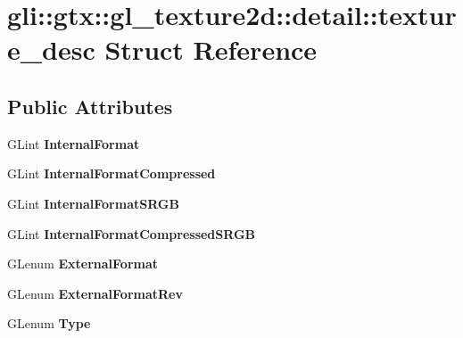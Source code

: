 \hypertarget{structgli_1_1gtx_1_1gl__texture2d_1_1detail_1_1texture__desc}{\section{gli\-:\-:gtx\-:\-:gl\-\_\-texture2d\-:\-:detail\-:\-:texture\-\_\-desc \-Struct \-Reference}
\label{structgli_1_1gtx_1_1gl__texture2d_1_1detail_1_1texture__desc}
}
\subsection*{\-Public \-Attributes}
\begin{DoxyCompactItemize}
\item 
\hypertarget{structgli_1_1gtx_1_1gl__texture2d_1_1detail_1_1texture__desc_a1516e18e5bd033b3e9d68e9b4dc4c6d1}{\-G\-Lint {\bfseries \-Internal\-Format}}\label{structgli_1_1gtx_1_1gl__texture2d_1_1detail_1_1texture__desc_a1516e18e5bd033b3e9d68e9b4dc4c6d1}

\item 
\hypertarget{structgli_1_1gtx_1_1gl__texture2d_1_1detail_1_1texture__desc_ad78316e2eb567876c1a4a70f2076eab1}{\-G\-Lint {\bfseries \-Internal\-Format\-Compressed}}\label{structgli_1_1gtx_1_1gl__texture2d_1_1detail_1_1texture__desc_ad78316e2eb567876c1a4a70f2076eab1}

\item 
\hypertarget{structgli_1_1gtx_1_1gl__texture2d_1_1detail_1_1texture__desc_a0bfa1687a13d0348bd5b4dd5942a379c}{\-G\-Lint {\bfseries \-Internal\-Format\-S\-R\-G\-B}}\label{structgli_1_1gtx_1_1gl__texture2d_1_1detail_1_1texture__desc_a0bfa1687a13d0348bd5b4dd5942a379c}

\item 
\hypertarget{structgli_1_1gtx_1_1gl__texture2d_1_1detail_1_1texture__desc_abb06603c2b71da31a7a8c9c1121d478f}{\-G\-Lint {\bfseries \-Internal\-Format\-Compressed\-S\-R\-G\-B}}\label{structgli_1_1gtx_1_1gl__texture2d_1_1detail_1_1texture__desc_abb06603c2b71da31a7a8c9c1121d478f}

\item 
\hypertarget{structgli_1_1gtx_1_1gl__texture2d_1_1detail_1_1texture__desc_a6610702d2064d6410a6c6eff7c7d9850}{\-G\-Lenum {\bfseries \-External\-Format}}\label{structgli_1_1gtx_1_1gl__texture2d_1_1detail_1_1texture__desc_a6610702d2064d6410a6c6eff7c7d9850}

\item 
\hypertarget{structgli_1_1gtx_1_1gl__texture2d_1_1detail_1_1texture__desc_a48f1d18ac0378f6d0cb004c8131e1de2}{\-G\-Lenum {\bfseries \-External\-Format\-Rev}}\label{structgli_1_1gtx_1_1gl__texture2d_1_1detail_1_1texture__desc_a48f1d18ac0378f6d0cb004c8131e1de2}

\item 
\hypertarget{structgli_1_1gtx_1_1gl__texture2d_1_1detail_1_1texture__desc_a82450f5df20b4b58f7416665b1865b2b}{\-G\-Lenum {\bfseries \-Type}}\label{structgli_1_1gtx_1_1gl__texture2d_1_1detail_1_1texture__desc_a82450f5df20b4b58f7416665b1865b2b}

\end{DoxyCompactItemize}


